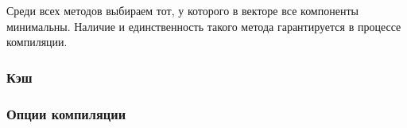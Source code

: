 Среди всех методов выбираем тот, у которого в векторе все компоненты минимальны. Наличие и единственность такого метода гарантируется в процессе компиляции.

\subsubsection{Кэш}

\subsubsection{Опции компиляции}
